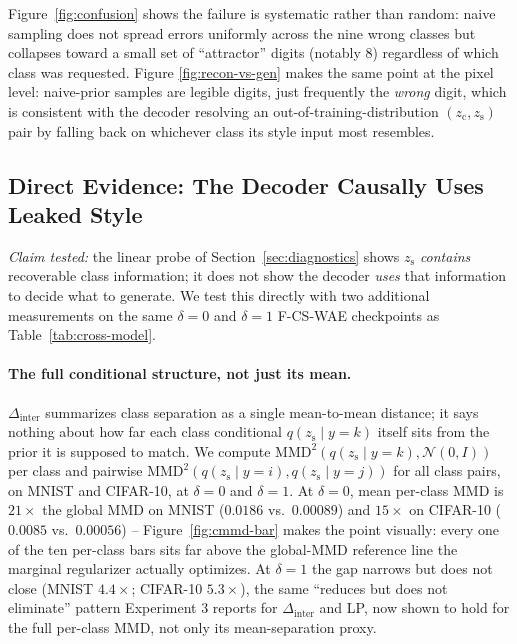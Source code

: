 \documentclass[10pt,letterpaper]{article}
\newcommand{\ours}{F-CS-WAE}
\newcommand{\zc}{z_{\mathrm{c}}}
\newcommand{\zs}{z_{\mathrm{s}}}
\newcommand{\MMD}{\mathrm{MMD}}
\begin{document}
Figure~\ref{fig:confusion} shows the failure is systematic rather than
random: naive sampling does not spread errors uniformly across the nine
wrong classes but collapses toward a small set of ``attractor'' digits
(notably 8) regardless of which class was requested. Figure
\ref{fig:recon-vs-gen} makes the same point at the pixel level: naive-prior
samples are legible digits, just frequently the \emph{wrong} digit, which is
consistent with the decoder resolving an out-of-training-distribution
$(\zc,\zs)$ pair by falling back on whichever class its style input most
resembles.

\subsection{Direct Evidence: The Decoder Causally Uses Leaked Style}
\label{sec:swap}

\emph{Claim tested:} the linear probe of Section~\ref{sec:diagnostics} shows
$\zs$ \emph{contains} recoverable class information; it does not show the
decoder \emph{uses} that information to decide what to generate. We test
this directly with two additional measurements on the same $\delta{=}0$ and
$\delta{=}1$ \ours{} checkpoints as Table~\ref{tab:cross-model}.

\paragraph{The full conditional structure, not just its mean.}
$\Delta_{\mathrm{inter}}$ summarizes class separation as a single
mean-to-mean distance; it says nothing about how far each class conditional
$q(\zs\mid y{=}k)$ itself sits from the prior it is supposed to match. We
compute $\MMD^2(q(\zs\mid y{=}k),\mathcal N(0,I))$ per class and pairwise
$\MMD^2(q(\zs\mid y{=}i),q(\zs\mid y{=}j))$ for all class pairs, on MNIST and
CIFAR-10, at $\delta{=}0$ and $\delta{=}1$. At $\delta{=}0$, mean per-class
MMD is $21\times$ the global MMD on MNIST ($0.0186$ vs.\ $0.00089$) and
$15\times$ on CIFAR-10 ($0.0085$ vs.\ $0.00056$) -- Figure~\ref{fig:cmmd-bar}
makes the point visually: every one of the ten per-class bars sits far above
the global-MMD reference line the marginal regularizer actually optimizes.
At $\delta{=}1$ the gap narrows but does not close (MNIST $4.4\times$;
CIFAR-10 $5.3\times$), the same ``reduces but does not eliminate'' pattern
Experiment 3 reports for $\Delta_{\mathrm{inter}}$ and LP, now shown to hold
for the full per-class MMD, not only its mean-separation proxy.
\end{document}
